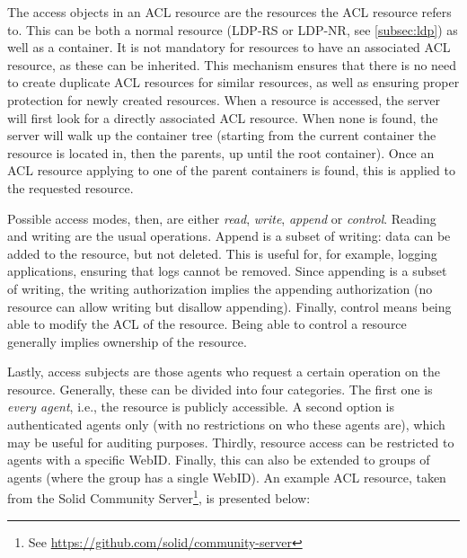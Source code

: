 The access objects in an \gls{ACL} resource are the resources the \gls{ACL} resource refers to. This can be both a normal resource (LDP-RS or LDP-NR, see \ref{subsec:ldp}) as well as a container. It is not mandatory for resources to have an associated ACL resource, as these can be inherited. This mechanism ensures that there is no need to create duplicate ACL resources for similar resources, as well as ensuring proper protection for newly created resources. When a resource is accessed, the server will first look for a directly associated \gls{ACL} resource. When none is found, the server will walk up the container tree (starting from the current container the resource is located in, then the parents, up until the root container). Once an \gls{ACL} resource applying to one of the parent containers is found, this is applied to the requested resource.

Possible access modes, then, are either \textit{read}, \textit{write}, \textit{append} or \textit{control}. Reading and writing are the usual operations. Append is a subset of writing: data can be added to the resource, but not deleted. This is useful for, for example, logging applications, ensuring that logs cannot be removed. Since appending is a subset of writing, the writing authorization implies the appending authorization (no resource can allow writing but disallow appending). Finally, control means being able to modify the ACL of the resource. Being able to control a resource generally implies ownership of the resource.

Lastly, access subjects are those agents who request a certain operation on the resource. Generally, these can be divided into four categories. The first one is \textit{every agent}, i.e., the resource is publicly accessible. A second option is authenticated agents only (with no restrictions on who these agents are), which may be useful for auditing purposes. Thirdly, resource access can be restricted to agents with a specific WebID. Finally, this can also be extended to groups of agents (where the group has a single WebID). An example \gls{ACL} resource, taken from the Solid Community Server\footnote{See \url{https://github.com/solid/community-server}}, is presented below:


